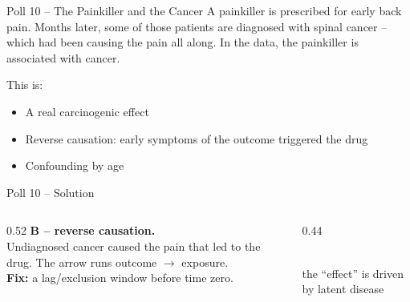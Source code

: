 \documentclass[aspectratio=169]{beamer}
\begin{document}
\begin{frame}{Poll 10 \;--\; The Painkiller and the Cancer}
  \small
  A painkiller is prescribed for early back pain. Months later, some of those
  patients are diagnosed with spinal cancer -- which had been causing the pain
  all along. In the data, the painkiller is associated with cancer.
  \vspace{0.8em}

  This is:
  \begin{itemize}
    \item[\textbf{A.}] A real carcinogenic effect
    \item[\textbf{B.}] Reverse causation: early symptoms of the outcome triggered the drug
    \item[\textbf{C.}] Confounding by age
  \end{itemize}
\end{frame}

\begin{frame}{Poll 10 \;--\; Solution}
  \small
  \begin{columns}[T]
    \begin{column}{0.52\textwidth}
      \textcolor{good}{\textbf{B -- reverse causation.}}\\[0.4em]
      Undiagnosed cancer caused the pain that led to the drug. The arrow runs
      outcome $\to$ exposure.\\[0.3em]
      \textcolor{accent}{\textbf{Fix:}} a lag/exclusion window before time zero.
    \end{column}
    \begin{column}{0.44\textwidth}
      \centering
      \\[0.3em]
      {\scriptsize the ``effect'' is driven by latent disease}
    \end{column}
  \end{columns}
\end{frame}
\end{document}
